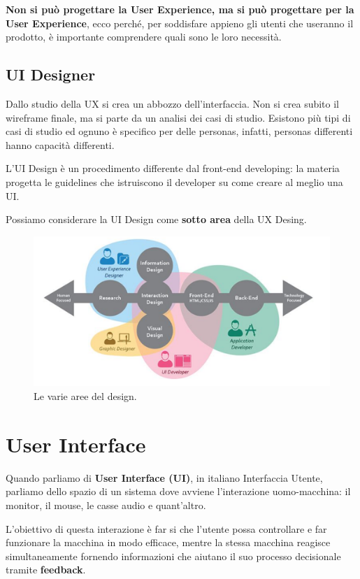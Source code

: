 \documentclass[a4paper,11pt,oneside]{book}
\begin{document}
\textbf{Non si può progettare la User Experience, ma si può progettare per la User Experience}, ecco perché, per soddisfare appieno gli utenti che useranno il prodotto, è importante comprendere quali sono le loro necessità.

\section{UI Designer}
Dallo studio della UX si crea un abbozzo dell'interfaccia. Non si crea subito il wireframe finale, ma si parte da un analisi dei casi di studio. Esistono più tipi di casi di studio ed ognuno è specifico per delle personas, infatti, personas differenti hanno capacità differenti.

L'UI Design è un procedimento differente dal front-end developing: la materia progetta le guidelines che istruiscono il developer su come creare al meglio una UI.

Possiamo considerare la UI Design come \textbf{sotto area} della UX Desing.

\begin{figure}[!h]
	\centering
	\includegraphics[scale = 0.4]{immagini/UX_and_UI.png}
	\caption{Le varie aree del design.}
\end{figure}


\chapter{User Interface}
Quando parliamo di \textbf{User Interface (UI)}, in italiano Interfaccia Utente, parliamo dello spazio di un sistema dove avviene l'interazione uomo-macchina: il monitor, il mouse, le casse audio e quant'altro.

L'obiettivo di questa interazione è far si che l'utente possa controllare e far funzionare la macchina in modo efficace, mentre la stessa macchina reagisce simultaneamente fornendo informazioni che aiutano il suo processo decisionale tramite \textbf{feedback}.
\end{document}
